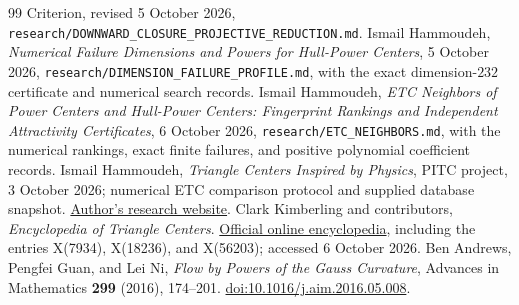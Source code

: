 \documentclass[11pt]{article}
\theoremstyle{definition}
\newcommand{\pathcode}[1]{\nolinkurl{#1}}
\begin{document}
\begin{thebibliography}{99}
{Criterion}, revised 5 October 2026,
\pathcode{research/DOWNWARD_CLOSURE_PROJECTIVE_REDUCTION.md}.
Ismail Hammoudeh, \emph{Numerical Failure Dimensions and Powers for
Hull-Power Centers}, 5 October 2026,
\pathcode{research/DIMENSION_FAILURE_PROFILE.md}, with the exact
dimension-$232$ certificate and numerical search records.
Ismail Hammoudeh, \emph{ETC Neighbors of Power Centers and Hull-Power Centers:
Fingerprint Rankings and Independent Attractivity Certificates},
6 October 2026, \pathcode{research/ETC_NEIGHBORS.md}, with the numerical
rankings, exact finite failures, and positive polynomial coefficient records.
Ismail Hammoudeh, \emph{Triangle Centers Inspired by Physics}, PITC project,
3 October 2026; numerical ETC comparison protocol and supplied database snapshot.
\href{https://ismaa3iil.fyi/}{Author's research website}.
Clark Kimberling and contributors, \emph{Encyclopedia of Triangle Centers}.
\href{https://faculty.evansville.edu/ck6/encyclopedia/etc.html}{Official online encyclopedia},
including the entries X(7934), X(18236), and X(56203); accessed 6 October 2026.
Ben Andrews, Pengfei Guan, and Lei Ni,
\emph{Flow by Powers of the Gauss Curvature},
Advances in Mathematics \textbf{299} (2016), 174--201.
\href{https://doi.org/10.1016/j.aim.2016.05.008}{doi:10.1016/j.aim.2016.05.008}.
\end{thebibliography}
\end{document}
